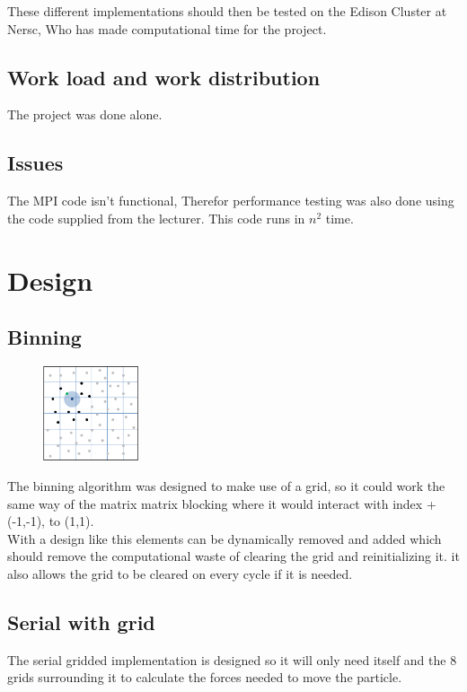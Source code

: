 \documentclass[a4paper,10pt,titlepage]{report}
\begin{document}
These different implementations should then be tested on the Edison Cluster at Nersc, Who has made computational time for the project. \\

\subsection{Work load and work distribution}
The project was done alone. 

\subsection{Issues}

The MPI code isn't functional, Therefor performance testing was also done using the code supplied from the lecturer. This code runs in $n^2$ time.

\newpage

\section{Design}

\subsection{Binning}
\begin{figure} %
    \centering
    \includegraphics[width=0.25\textwidth]{grid.png}
\end{figure}
The binning algorithm was designed to make use of a grid, so it could work the same way of the matrix matrix blocking where it would interact with index +(-1,-1), to (1,1). \\

With a design like this elements can be dynamically removed and added which should remove the computational waste of clearing the grid and reinitializing it. it also allows the grid to be cleared on every cycle if it is needed. \\

\subsection{Serial with grid}
The serial gridded implementation is designed so it will only need itself and the 8 grids surrounding it to calculate the forces needed to move the particle.
\end{document}
